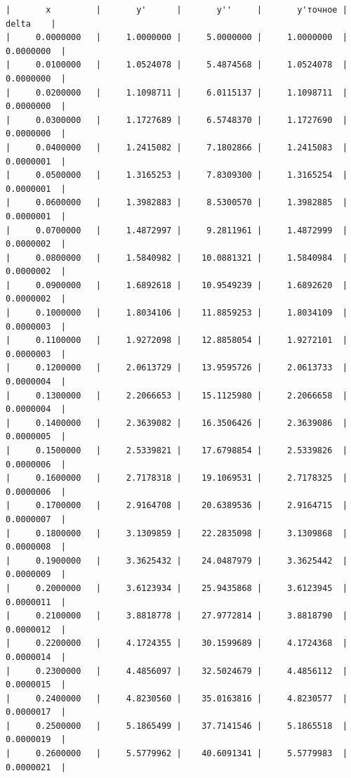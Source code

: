 \documentclass[14pt, russian]{scrartcl}
\begin{document}
\vspace{0.5cm}
  \begin{verbatim}
|       x         |       y'      |       y''     |       y'точное |       delta    |
|     0.0000000   |     1.0000000 |     5.0000000 |     1.0000000  |     0.0000000  |
|     0.0100000   |     1.0524078 |     5.4874568 |     1.0524078  |     0.0000000  |
|     0.0200000   |     1.1098711 |     6.0115137 |     1.1098711  |     0.0000000  |
|     0.0300000   |     1.1727689 |     6.5748370 |     1.1727690  |     0.0000000  |
|     0.0400000   |     1.2415082 |     7.1802866 |     1.2415083  |     0.0000001  |
|     0.0500000   |     1.3165253 |     7.8309300 |     1.3165254  |     0.0000001  |
|     0.0600000   |     1.3982883 |     8.5300570 |     1.3982885  |     0.0000001  |
|     0.0700000   |     1.4872997 |     9.2811961 |     1.4872999  |     0.0000002  |
|     0.0800000   |     1.5840982 |    10.0881321 |     1.5840984  |     0.0000002  |
|     0.0900000   |     1.6892618 |    10.9549239 |     1.6892620  |     0.0000002  |
|     0.1000000   |     1.8034106 |    11.8859253 |     1.8034109  |     0.0000003  |
|     0.1100000   |     1.9272098 |    12.8858054 |     1.9272101  |     0.0000003  |
|     0.1200000   |     2.0613729 |    13.9595726 |     2.0613733  |     0.0000004  |
|     0.1300000   |     2.2066653 |    15.1125980 |     2.2066658  |     0.0000004  |
|     0.1400000   |     2.3639082 |    16.3506426 |     2.3639086  |     0.0000005  |
|     0.1500000   |     2.5339821 |    17.6798854 |     2.5339826  |     0.0000006  |
|     0.1600000   |     2.7178318 |    19.1069531 |     2.7178325  |     0.0000006  |
|     0.1700000   |     2.9164708 |    20.6389536 |     2.9164715  |     0.0000007  |
|     0.1800000   |     3.1309859 |    22.2835098 |     3.1309868  |     0.0000008  |
|     0.1900000   |     3.3625432 |    24.0487979 |     3.3625442  |     0.0000009  |
|     0.2000000   |     3.6123934 |    25.9435868 |     3.6123945  |     0.0000011  |
|     0.2100000   |     3.8818778 |    27.9772814 |     3.8818790  |     0.0000012  |
|     0.2200000   |     4.1724355 |    30.1599689 |     4.1724368  |     0.0000014  |
|     0.2300000   |     4.4856097 |    32.5024679 |     4.4856112  |     0.0000015  |
|     0.2400000   |     4.8230560 |    35.0163816 |     4.8230577  |     0.0000017  |
|     0.2500000   |     5.1865499 |    37.7141546 |     5.1865518  |     0.0000019  |
|     0.2600000   |     5.5779962 |    40.6091341 |     5.5779983  |     0.0000021  |

\end{verbatim}
\end{document}
